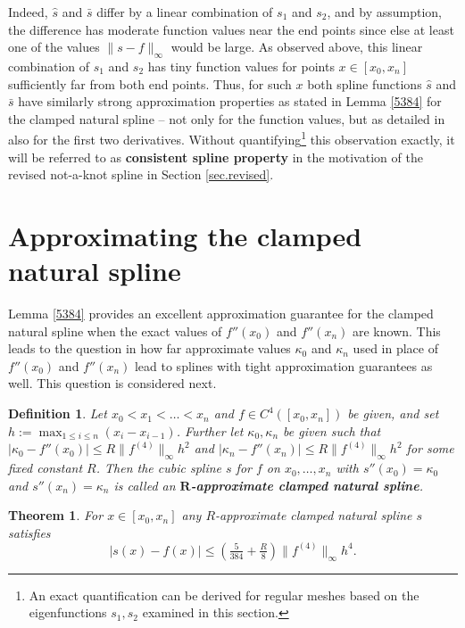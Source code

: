 \documentclass[12pt]{article}
\newtheorem{theorem}{Theorem}%
\newtheorem{definition}{Definition}
\begin{document}
Indeed,  $\hat s$ and $\bar s$ differ by a linear combination of
$s_1$ and $s_2$, and by assumption,
the difference has moderate function values near the end points
since else at least one of the values $\|s-f\|_\infty$ would be large. 
As observed above, this linear combination of $s_1$ and $s_2$ has
tiny function values for points $x\in[x_0,x_n]$ sufficiently far from both
end points. Thus, for such $x$ both spline functions $\hat s$ and $\bar s$ 
have similarly strong approximation
properties as stated in Lemma \ref{5384} for the clamped natural spline
-- not only for the function values, but as detailed in \cite{HallMeyer}
also for the first two derivatives.
Without quantifying\footnote{%
An exact quantification can be derived for regular meshes based
on the eigenfunctions $s_1,s_2$ examined in this section.}
this observation exactly, it
will be referred to as {\bf consistent spline property}
in the motivation of the revised not-a-knot spline in Section
\ref{sec.revised}.








\section{Approximating the clamped natural spline}

Lemma \ref{5384} provides an excellent approximation
guarantee for the clamped natural spline when the exact values of
$f''(x_0)$ and $f''(x_n)$ are known. 
This leads to the question in how far approximate values
$\kappa_0$ and $\kappa_n$ used in place of 
$f''(x_0)$ and $f''(x_n)$ lead to splines with
tight approximation guarantees as well. This question is considered next.


\begin{definition}\label{def1}
  Let  $x_0<x_1<\ldots <x_n$ and $f\in C^4([x_0,x_n])$ be given,
  and set $h:=\max_{1\le i\le n}(x_i-x_{i-1})$.
  Further let $\kappa_0,\kappa_n$ be given such that
  $|\kappa_0-f''(x_0)|\le R\|f^{(4)}\|_\infty h^2$ and
  $|\kappa_n-f''(x_n)|\le R\|f^{(4)}\|_\infty h^2$
  for some fixed constant $R$.
  Then the cubic spline $s$ for $f$ on $x_0,\ldots ,x_n$
  with $s''(x_0)=\kappa_0$ and $s''(x_n)=\kappa_n$ is
  called an {\bf $\mathbf R$-approximate clamped natural spline}.  
\end{definition}


\begin{theorem}\label{theorem1}  
  For $x\in[x_0,x_n]$ any $R$-approximate clamped natural spline $s$ satisfies
  $$
  |s(x)-f(x)|\le \left(\tfrac{5}{384}+\tfrac{R}{8}\right)
  \|f^{(4)}\|_\infty h^4.
  $$
\end{theorem}
\end{document}
